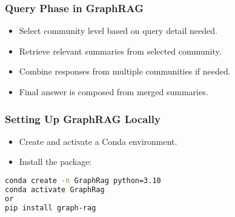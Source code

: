 
	

	


\begin{frame}[fragile]\frametitle{Query Phase in GraphRAG}
  \begin{itemize}
    \item Select community level based on query detail needed.
    \item Retrieve relevant summaries from selected community.
    \item Combine responses from multiple communities if needed.
    \item Final answer is composed from merged summaries.
  \end{itemize}
\end{frame}



\begin{frame}[fragile]\frametitle{Setting Up GraphRAG Locally}
  \begin{itemize}
    \item Create and activate a Conda environment.
    \item Install the package:
  \end{itemize}
	
    \begin{lstlisting}[language=bash]
conda create -n GraphRag python=3.10
conda activate GraphRag
or
pip install graph-rag
    \end{lstlisting}
\end{frame}



